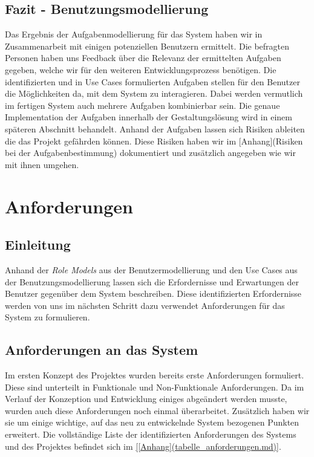 \subsection{Fazit - Benutzungsmodellierung}
\label{sec:Fazit_Benutzungsmodellierung}

Das Ergebnis der Aufgabenmodellierung für das System haben wir in
Zusammenarbeit mit einigen potenziellen Benutzern ermittelt.
Die befragten Personen haben uns Feedback über die Relevanz der ermittelten
Aufgaben gegeben, welche wir für den weiteren Entwicklungsprozess benötigen.
Die identifizierten und in Use Cases formulierten Aufgaben stellen für den
Benutzer die Möglichkeiten da, mit dem System zu interagieren. Dabei werden
vermutlich im fertigen System auch mehrere Aufgaben kombinierbar sein.
Die genaue Implementation der Aufgaben innerhalb der Gestaltungslösung wird in
einem späteren Abschnitt behandelt. Anhand der Aufgaben lassen sich Risiken
ableiten die das Projekt gefährden können. Diese Risiken haben wir im [Anhang](Risiken bei der Aufgabenbestimmung)
dokumentiert und zusätzlich angegeben wie wir mit ihnen umgehen.


\section{Anforderungen}
\label{sec:Anforderungen}

\subsection{Einleitung}
\label{sec:Anforderungen_Einleitung}
Anhand der \textit{Role Models} aus der Benutzermodellierung und den Use Cases
aus der Benutzungsmodellierung lassen sich die Erfordernisse und Erwartungen
der Benutzer gegenüber dem System beschreiben. Diese identifizierten
Erfordernisse werden von uns im nächsten Schritt dazu verwendet Anforderungen
für das System zu formulieren.

\subsection{Anforderungen an das System}
\label{sec:Anforderungen an das System}
Im ersten Konzept des Projektes wurden bereits erste Anforderungen formuliert.
Diese sind unterteilt in Funktionale und Non-Funktionale Anforderungen.
Da im Verlauf der Konzeption und Entwicklung einiges abgeändert werden musste,
wurden auch diese Anforderungen noch einmal überarbeitet. Zusätzlich haben wir
sie um einige wichtige, auf das neu zu entwickelnde System bezogenen Punkten
erweitert. Die vollständige Liste der identifizierten Anforderungen des Systems
und des Projektes befindet sich im \ref{[Anhang](tabelle_anforderungen.md)}.


